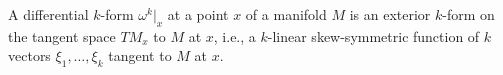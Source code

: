 A differential $k$-form $\omega^k|_x$ at a point $x$ of a manifold $M$ is an exterior $k$-form on the tangent space $TM_x$ to $M$ at $x$, i.e., a $k$-linear skew-symmetric function of $k$ vectors $\xi_1, \ldots, \xi_k$ tangent to $M$ at $x$.
